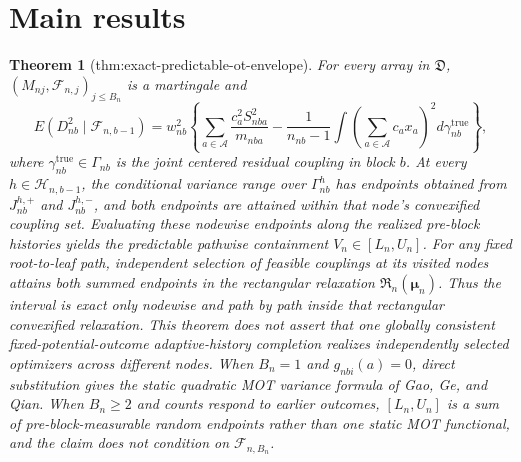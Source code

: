 \documentclass{article}
\newtheorem{theorem}{Theorem}
\begin{document}
\section{Main results}

\begin{theorem}[thm:exact-predictable-ot-envelope]\label{thm:exact-predictable-ot-envelope}
For every array in \(\mathfrak D\), \((M_{nj},\mathcal F_{n,j})_{j\le B_n}\) is a martingale and \[E(D_{nb}^2\mid\mathcal F_{n,b-1})=w_{nb}^2\left\{\sum_{a\in\mathcal A}\frac{c_a^2S_{nba}^2}{m_{nba}}-\frac1{n_{nb}-1}\int\left(\sum_{a\in\mathcal A}c_ax_a\right)^2d\gamma_{nb}^{\mathrm{true}}\right\},\] where \(\gamma_{nb}^{\mathrm{true}}\in\Gamma_{nb}\) is the joint centered residual coupling in block \(b\). At every \(h\in\mathcal H_{n,b-1}\), the conditional variance range over \(\Gamma_{nb}^{h}\) has endpoints obtained from \(J_{nb}^{h,+}\) and \(J_{nb}^{h,-}\), and both endpoints are attained within that node's convexified coupling set. Evaluating these nodewise endpoints along the realized pre-block histories yields the predictable pathwise containment \(V_n\in[L_n,U_n]\). For any fixed root-to-leaf path, independent selection of feasible couplings at its visited nodes attains both summed endpoints in the rectangular relaxation \(\mathfrak R_n(\boldsymbol\mu_n)\). Thus the interval is exact only nodewise and path by path inside that rectangular convexified relaxation. This theorem does not assert that one globally consistent fixed-potential-outcome adaptive-history completion realizes independently selected optimizers across different nodes. When \(B_n=1\) and \(g_{nbi}(a)=0\), direct substitution gives the static quadratic MOT variance formula of Gao, Ge, and Qian. When \(B_n\ge2\) and counts respond to earlier outcomes, \([L_n,U_n]\) is a sum of pre-block-measurable random endpoints rather than one static MOT functional, and the claim does not condition on \(\mathcal F_{n,B_n}\).
\end{theorem}
\end{document}
